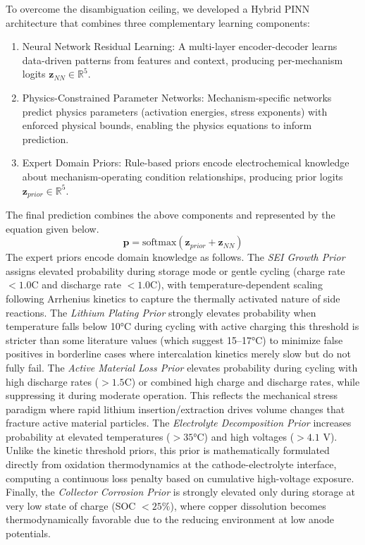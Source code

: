 \documentclass[5p,times,authoryear]{elsarticle}
\begin{document}
To overcome the disambiguation ceiling, we developed a Hybrid PINN architecture that combines three complementary learning components:

\begin{enumerate}[(\alph*)]
    \item {Neural Network Residual Learning:} A multi-layer encoder-decoder learns data-driven patterns from features and context, producing per-mechanism logits $\mathbf{z}_{NN} \in \mathbb{R}^5$.
    
    \item {Physics-Constrained Parameter Networks:} Mechanism-specific networks predict physics parameters (activation energies, stress exponents) with enforced physical bounds, enabling the physics equations to inform prediction.
    
    \item {Expert Domain Priors:} Rule-based priors encode electrochemical knowledge about mechanism-operating condition relationships, producing prior logits $\mathbf{z}_{prior} \in \mathbb{R}^5$.
\end{enumerate}

The final prediction combines the above components and represented by the equation given below.
\begin{equation}
\mathbf{p} = \text{softmax}(\mathbf{z}_{prior} + \mathbf{z}_{NN})
\label{eq:hybrid_combination}
\end{equation}
The expert priors encode domain knowledge as follows. The \emph{SEI Growth Prior} assigns elevated probability during storage mode or gentle cycling (charge rate $< 1.0$C and discharge rate $< 1.0$C), with temperature-dependent scaling following Arrhenius kinetics to capture the thermally activated nature of side reactions. The \emph{Lithium Plating Prior} strongly elevates probability when temperature falls below 10°C during cycling with active charging this threshold is stricter than some literature values (which suggest 15--17°C) to minimize false positives in borderline cases where intercalation kinetics merely slow but do not fully fail. The \emph{Active Material Loss Prior} elevates probability during cycling with high discharge rates ($> 1.5$C) or combined high charge and discharge rates, while suppressing it during moderate operation. This reflects the mechanical stress paradigm where rapid lithium insertion/extraction drives volume changes that fracture active material particles. The \emph{Electrolyte Decomposition Prior} increases probability at elevated temperatures ($> 35$°C) and high voltages ($> 4.1$ V). Unlike the kinetic threshold priors, this prior is mathematically formulated directly from oxidation thermodynamics at the cathode-electrolyte interface, computing a continuous loss penalty based on cumulative high-voltage exposure. Finally, the \emph{Collector Corrosion Prior} is strongly elevated only during storage at very low state of charge (SOC $< 25\%$), where copper dissolution becomes thermodynamically favorable due to the reducing environment at low anode potentials.
\end{document}
